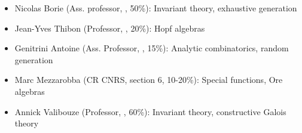 \begin{itemize}


\item Nicolas Borie (Ass. professor, \CS, 50\%): Invariant theory,
  exhaustive generation%
\item Jean-Yves Thibon (Professor, \CS, 20\%):
  Hopf algebras


\item Genitrini Antoine (Ass. Professor, \CS, 15\%): %
  Analytic combinatorics, random generation
\item Marc Mezzarobba (CR CNRS, section 6, 10-20\%): %
  Special functions, Ore algebras
\item Annick Valibouze (Professor, \CS, 60\%): %
  Invariant theory, %
  constructive Galois theory




\end{itemize}
